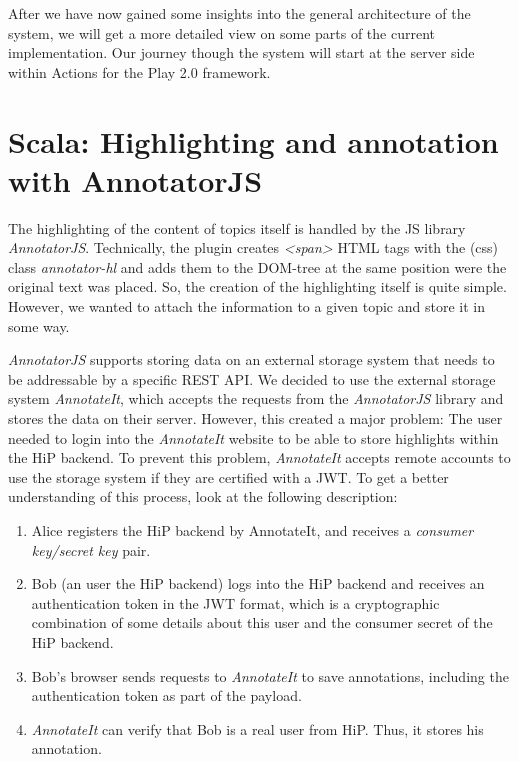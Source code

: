 After we have now gained some insights into the general architecture of the system, we will get a more detailed view on some parts of the current implementation. Our journey though the system will start at the server side within Actions for the Play 2.0 framework.

\section{Scala: Highlighting and annotation with AnnotatorJS}
The highlighting of the content of topics itself is handled by the \ac{JS} library \emph{AnnotatorJS}. Technically, the plugin creates \emph{<span>} \ac{HTML} tags with the (css) class \emph{annotator-hl} and adds them to the \ac{DOM}-tree at the same position were the original text was placed. So, the creation of the highlighting itself is quite simple. However, we wanted to attach the information to a given topic and store it in some way.  

\emph{AnnotatorJS} supports storing data on an external storage system that needs to be addressable by a specific \ac{REST} \ac{API}. We decided to use the external storage system \emph{AnnotateIt}, which accepts the requests from the \emph{AnnotatorJS} library and stores the data on their server. However, this created a major problem: The user needed to login into the \emph{AnnotateIt} website to be able to store highlights within the \ac{HiP} backend. To prevent this problem, \emph{AnnotateIt} accepts remote accounts to use the storage system if they are certified with a \ac{JWT}. To get a better understanding of this process, look at the following description:

\begin{enumerate}
\item Alice registers the \ac{HiP} backend by AnnotateIt, and receives a \emph{consumer key/secret key} pair.
\item Bob (an user the \ac{HiP} backend) logs into the \ac{HiP} backend and receives an authentication token in the \ac{JWT} format, which is a cryptographic combination of some details about this user and the consumer secret of the \ac{HiP} backend.
\item Bob's browser sends requests to \emph{AnnotateIt} to save annotations, including the authentication token as part of the payload.
\item \emph{AnnotateIt} can verify that Bob is a real user from \ac{HiP}. Thus, it stores his annotation.
\end{enumerate}

